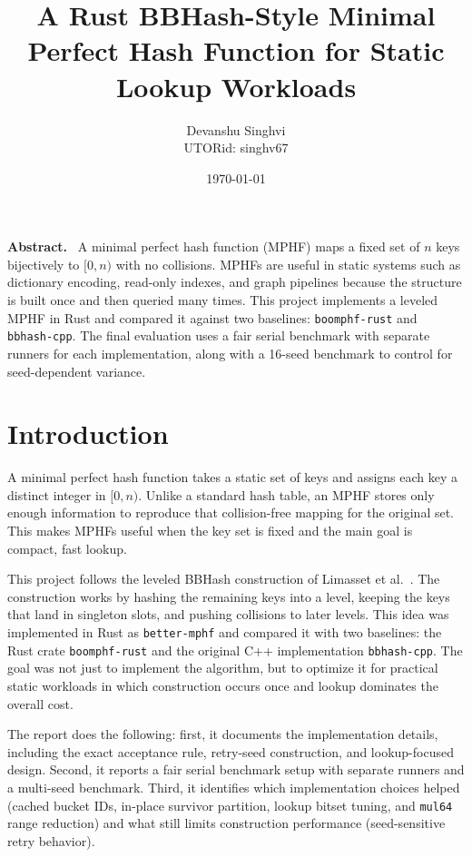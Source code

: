 \documentclass[10pt]{article}
\title{A Rust BBHash-Style Minimal Perfect Hash Function for Static Lookup Workloads}
\author{Devanshu Singhvi\\
\small UTORid: singhv67}
\date{\today}
\renewenvironment{abstract}{\noindent\textbf{Abstract.}\ }{\par}
\begin{document}
\maketitle

\begin{abstract}
A minimal perfect hash function (MPHF) maps a fixed set of $n$ keys bijectively to $[0,n)$ with no collisions. MPHFs are useful in static systems such as dictionary encoding, read-only indexes, and graph pipelines because the structure is built once and then queried many times. This project implements a leveled MPHF in Rust and compared it against two baselines: \texttt{boomphf-rust} and \texttt{bbhash-cpp}. The final evaluation uses a fair serial benchmark with separate runners for each implementation, along with a 16-seed benchmark to control for seed-dependent variance.
\end{abstract}

\section{Introduction}
A minimal perfect hash function takes a static set of keys and assigns each key a distinct integer in $[0,n)$. Unlike a standard hash table, an MPHF stores only enough information to reproduce that collision-free mapping for the original set. This makes MPHFs useful when the key set is fixed and the main goal is compact, fast lookup.

This project follows the leveled BBHash construction of Limasset et al.~\cite{sea2017}. The construction works by hashing the remaining keys into a level, keeping the keys that land in singleton slots, and pushing collisions to later levels. This idea was implemented in Rust as \texttt{better-mphf} and compared it with two baselines: the Rust crate \texttt{boomphf-rust} and the original C++ implementation \texttt{bbhash-cpp}. The goal was not just to implement the algorithm, but to optimize it for practical static workloads in which construction occurs once and lookup dominates the overall cost.

The report does the following: first, it documents the implementation details, including the exact acceptance rule, retry-seed construction, and lookup-focused design. Second, it reports a fair serial benchmark setup with separate runners and a multi-seed benchmark. Third, it identifies which implementation choices helped (cached bucket IDs, in-place survivor partition, lookup bitset tuning, and \texttt{mul64} range reduction) and what still limits construction performance (seed-sensitive retry behavior).
\end{document}
